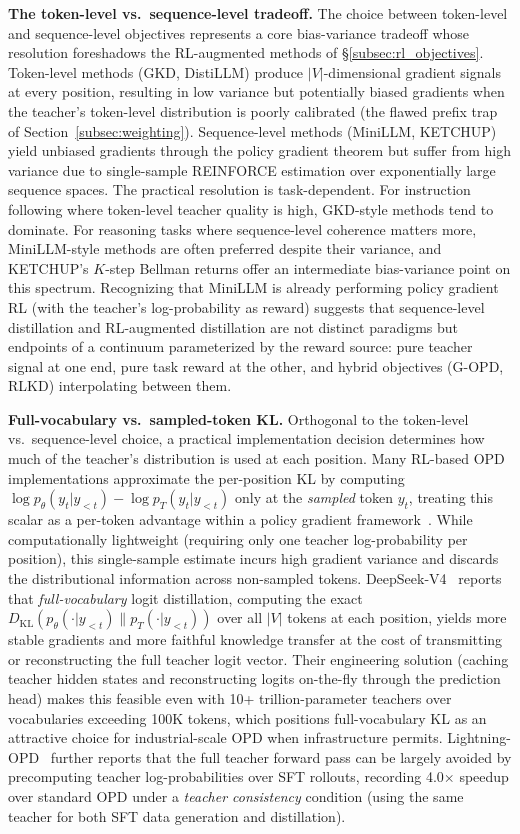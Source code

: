 \documentclass{article} %
\newcommand{\KL}{D_{\mathrm{KL}}}
\newcommand{\ptheta}{p_\theta}
\newcommand{\pteacher}{p_T}
\begin{document}
\textbf{The token-level vs.\ sequence-level tradeoff.} The choice between token-level and sequence-level objectives represents a core bias-variance tradeoff whose resolution foreshadows the RL-augmented methods of \S\ref{subsec:rl_objectives}. Token-level methods (GKD, DistiLLM) produce $|V|$-dimensional gradient signals at every position, resulting in low variance but potentially biased gradients when the teacher's token-level distribution is poorly calibrated (the flawed prefix trap of Section~\ref{subsec:weighting}). Sequence-level methods (MiniLLM, KETCHUP) yield unbiased gradients through the policy gradient theorem but suffer from high variance due to single-sample REINFORCE estimation over exponentially large sequence spaces. The practical resolution is task-dependent. For instruction following where token-level teacher quality is high, GKD-style methods tend to dominate. For reasoning tasks where sequence-level coherence matters more, MiniLLM-style methods are often preferred despite their variance, and KETCHUP's $K$-step Bellman returns offer an intermediate bias-variance point on this spectrum. Recognizing that MiniLLM is already performing policy gradient RL (with the teacher's log-probability as reward) suggests that sequence-level distillation and RL-augmented distillation are not distinct paradigms but endpoints of a continuum parameterized by the reward source: pure teacher signal at one end, pure task reward at the other, and hybrid objectives (G-OPD, RLKD) interpolating between them.

\textbf{Full-vocabulary vs.\ sampled-token KL.} Orthogonal to the token-level vs.\ sequence-level choice, a practical implementation decision determines how much of the teacher's distribution is used at each position. Many RL-based OPD implementations approximate the per-position KL by computing $\log \ptheta(y_t|y_{<t}) - \log \pteacher(y_t|y_{<t})$ only at the \emph{sampled} token $y_t$, treating this scalar as a per-token advantage within a policy gradient framework~\citep{lu2025onpolicy}. While computationally lightweight (requiring only one teacher log-probability per position), this single-sample estimate incurs high gradient variance and discards the distributional information across non-sampled tokens. DeepSeek-V4~\citep{deepseekv4} reports that \emph{full-vocabulary} logit distillation, computing the exact $\KL(\ptheta(\cdot|y_{<t}) \parallel \pteacher(\cdot|y_{<t}))$ over all $|V|$ tokens at each position, yields more stable gradients and more faithful knowledge transfer at the cost of transmitting or reconstructing the full teacher logit vector. Their engineering solution (caching teacher hidden states and reconstructing logits on-the-fly through the prediction head) makes this feasible even with 10+ trillion-parameter teachers over vocabularies exceeding 100K tokens, which positions full-vocabulary KL as an attractive choice for industrial-scale OPD when infrastructure permits. Lightning-OPD~\citep{2604.13010} further reports that the full teacher forward pass can be largely avoided by precomputing teacher log-probabilities over SFT rollouts, recording 4.0$\times$ speedup over standard OPD under a \emph{teacher consistency} condition (using the same teacher for both SFT data generation and distillation).
\end{document}
